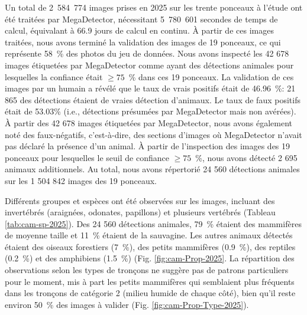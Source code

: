 Un total de \mbox{2 584 774} images prises en 2025 sur les trente ponceaux à l'étude ont été traitées par MegaDetector, nécessitant \mbox{5 780 601} secondes de temps de calcul, équivalant à 66.9 jours de calcul en continu. À partir de ces images traitées, nous avons terminé la validation des images de 19 ponceaux, ce qui représente 58~\% des photos du jeu de données. Nous avons inspecté les 42 678 images étiquetées par MegaDetector comme ayant des détections animales pour lesquelles la confiance était $\geq 75$~\% dans ces 19 ponceaux. La validation de ces images par un humain a révélé que le taux de vrais positifs était de 46.96~\%: 21 865 des détections étaient de vraies détection d'animaux. Le taux de faux positifs était de 53.03\% (i.e., détections présumées par MegaDetector mais non avérées). À partir des 42 678 images étiquetées par MegaDetector, nous avons également noté des faux-négatifs, c'est-à-dire, des sections d'images où MegaDetector n'avait pas déclaré la présence d'un animal. À partir de l'inspection des images des 19 ponceaux pour lesquelles le seuil de confiance $\geq 75$~\%, nous avons détecté 2 695 animaux additionnels. Au total, nous avons répertorié 24 560 détections animales sur les 1 504 842 images des 19 ponceaux.

Différents groupes et espèces ont été observées sur les images, incluant des invertébrés (araignées, odonates, papillons) et plusieurs vertébrés (Tableau \ref{tab:cam-sp-2025}). Des 24 560 détections animales, 79~\% étaient des mammifères de moyenne taille et 11~\% étaient de la sauvagine. Les autres animaux détectés étaient des oiseaux forestiers (7~\%), des petits mammifères (0.9~\%), des reptiles (0.2~\%) et des amphibiens (1.5~\%) (Fig. \ref{fig:cam-Prop-2025}. La répartition des observations selon les types de tronçons ne suggère pas de patrons particuliers pour le moment, mis à part les petits mammifères qui semblaient plus fréquents dans les tronçons de catégorie 2 (milieu humide de chaque côté), bien qu'il reste environ 50~\% des images à valider (Fig. \ref{fig:cam-Prop-Type-2025}).

